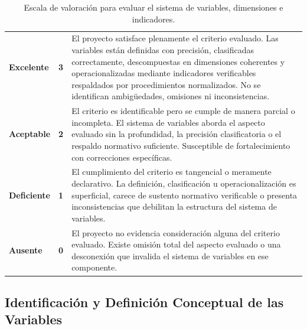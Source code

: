 \vspace{-12pt}
\begin{table}[htbp]
\centering
\scriptsize
\caption{Escala de valoración para evaluar el sistema de variables, dimensiones e indicadores.}
\label{tab:escala-variables}
\begin{tabularx}{\textwidth}{|C{3cm}|C{1.6cm}|X|}
\hline
{}
 &  &  \\ \hline
\textcolor{csuf}{\textbf{Excelente}} & \textbf{3} & El proyecto satisface plenamente el criterio evaluado. Las variables están definidas con precisión, clasificadas correctamente, descompuestas en dimensiones coherentes y operacionalizadas mediante indicadores verificables respaldados por procedimientos normalizados. No se identifican ambigüedades, omisiones ni inconsistencias. \\ \hline
{}
\textcolor{cace}{\textbf{Aceptable}} & \textbf{2} & El criterio es identificable pero se cumple de manera parcial o incompleta. El sistema de variables aborda el aspecto evaluado sin la profundidad, la precisión clasificatoria o el respaldo normativo suficiente. Susceptible de fortalecimiento con correcciones específicas. \\ \hline
\textcolor{cdef}{\textbf{Deficiente}} & \textbf{1} & El cumplimiento del criterio es tangencial o meramente declarativo. La definición, clasificación u operacionalización es superficial, carece de sustento normativo verificable o presenta inconsistencias que debilitan la estructura del sistema de variables. \\ \hline
{}
\textcolor{cins}{\textbf{Ausente}} & \textbf{0} & El proyecto no evidencia consideración alguna del criterio evaluado. Existe omisión total del aspecto evaluado o una desconexión que invalida el sistema de variables en ese componente. \\ \hline
\end{tabularx}
\end{table}

\clearpage
\subsection{Identificación y Definición Conceptual de las Variables}


